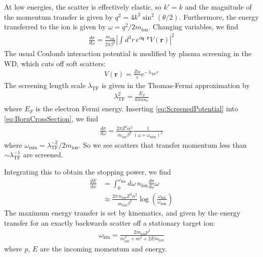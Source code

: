 \documentclass[twocolumn, preprintnumbers,amsmath,amssymb,prd, superscriptaddress]{revtex4}
\begin{document}
\begin{appendices}
At low energies, the scatter is effectively elastic, so $k' = k$ and the magnitude of the momentum transfer is given by $q^2 = 4 k^2\sin^2(\theta/2)$.
Furthermore, the energy transferred to the ion is given by $\omega = q^2 / 2m_\text{ion}$.
Changing variables, we find
\begin{align}
  \label{eq:BornCrossSection}
\frac{d \sigma}{d \omega} = \frac{m_\text{ion}}{2 \pi \beta^2} \left|\int d^3r \, e^{i\textbf{q}\cdot \textbf{r}}V(\textbf{r})\right|^2
\end{align}
The usual Coulomb interaction potential is modified by plasma screening in the WD, which cuts off soft scatters:
\begin{align}
  \label{eq:ScreenedPotential}
V(\textbf{r}) = \frac{Z \alpha}{r} e^{-\lambda_\text{TF} r}
\end{align}
The screening length scale $\lambda_\text{TF}$ is given in the Thomas-Fermi approximation by \cite{Teukolsky}
\begin{align}
\label{eq:TF}
    \lambda_\text{TF}^{2} = \frac{E_F}{6 \pi \alpha n_e}
\end{align}
where $E_F$ is the electron Fermi energy.
Inserting \eqref{eq:ScreenedPotential} into \eqref{eq:BornCrossSection}, we find
\begin{align}
\label{eq:CoulombOffIonsCrossSection}
\frac{d \sigma}{d \omega}
  = \frac{2 \pi Z^2 \alpha^2}{m_\text{ion}\beta^2} \frac{1}{(\omega + \omega_\text{min})^2}
\end{align}
where $\omega_\text{min} = \lambda_\text{TF}^{-2} / 2 m_\text{ion}$.
So we see scatters that transfer momentum less than $ \sim \lambda_\text{TF}^{-1}$ are screened.

Integrating this to obtain the stopping power, we find
\begin{align}
\frac{dE}{d x} &= \int_{0}^{\omega_\text{kin}} d \omega \, n_\text{ion} \frac{d \sigma}{d \omega} \omega \nonumber\\
\label{eq:StoppingPowerOffIons}
 &\approx \frac{2 \pi\, n_\text{ion} Z^2 \alpha^2 }{m_\text{ion}\beta^2} \log\left( \frac{\omega_\text{kin}}{\omega_\text{min}} \right)
\end{align}
The maximum energy transfer is set by kinematics, and given by
the energy transfer for an exactly backwards scatter off a stationary target ion:
\begin{align}
  \omega_\text{kin} = \frac{2 m_\text{ion} p^2}{m_\text{ion}^2 + m^2 + 2E m_\text{ion}}
\end{align}
where $p$, $E$ are the incoming momentum and energy.


\end{appendices}
\end{document}

